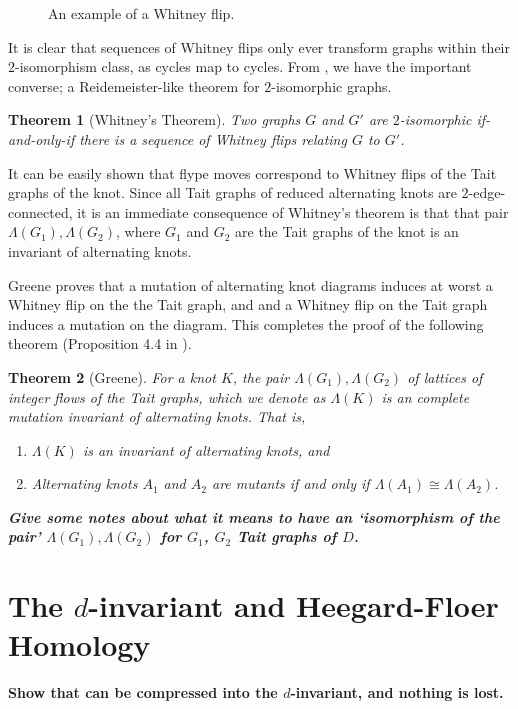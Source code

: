 \documentclass[12pt]{report}
\newcommand{\notered}[1]{{\color{Red} \textbf{#1}}}
\newcommand{\notegreen}[1]{{\color{Green} \textbf{#1}}}
\newtheorem*{theorem}{Theorem}
\begin{document}
\begin{figure}[hbt]
	\centering
	\def\svgscale{0.5}
	
	
	\caption{An example of a Whitney flip.}
	\label{fig:whitney_flip}
\end{figure}

It is clear that sequences of Whitney flips only ever transform graphs within their $2$-isomorphism class, as cycles map to cycles. From \cite{2-isomorphic-graphs}, we have the important converse; a Reidemeister-like theorem for $2$-isomorphic graphs.

\begin{theorem}[Whitney's Theorem]
Two graphs $G$ and $G'$ are $2$-isomorphic if-and-only-if there is a sequence of Whitney flips relating $G$ to $G'$.
\end{theorem}

It can be easily shown that flype moves correspond to Whitney flips of the Tait graphs of the knot. Since all Tait graphs of reduced alternating knots are $2$-edge-connected, it is an immediate consequence of Whitney's theorem is that that pair $\Lambda(G_{1}), \Lambda(G_{2})$, where $G_{1}$ and $G_{2}$ are the Tait graphs of the knot is an invariant of alternating knots.

Greene proves that a mutation of alternating knot diagrams induces at worst a Whitney flip on the the Tait graph, and and a Whitney flip on the Tait graph induces a mutation on the diagram. This completes the proof of the following theorem (Proposition 4.4 in \cite{lattices-graphs-mutation}).

\begin{theorem}[Greene]
For a knot $K$, the pair $\Lambda(G_{1}), \Lambda(G_{2})$ of lattices of integer flows of the Tait graphs, which we denote as $\Lambda(K)$ is an complete mutation invariant of alternating knots. That is,
\begin{enumerate}[(1)]
\item $\Lambda(K)$ is an invariant of alternating knots, and
\item Alternating knots $A_{1}$ and $A_{2}$ are mutants if and only if $\Lambda(A_{1}) \cong \Lambda(A_{2})$.
\end{enumerate}
\notered{Give some notes about what it means to have an `isomorphism of the pair' $\Lambda(G_{1}), \Lambda(G_{2})$ for $G_{1}$, $G_{2}$ Tait graphs of $D$.}

\end{theorem}

\section{\notegreen{The $d$-invariant and Heegard-Floer Homology}}
\notegreen{Show that can be compressed into the $d$-invariant, and nothing is lost.}
\end{document}
